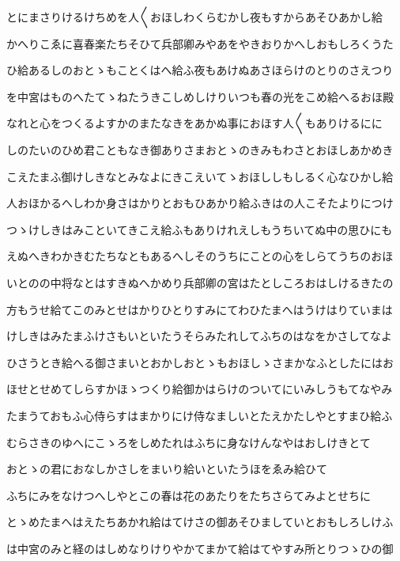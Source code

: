 \documentclass[a4paper,11pt,landscape]{ltjtarticle}
\begin{document}
\par\medskip
とにまさりけるけちめを人〱おほしわくらむかし夜もすからあそひあかし給
\par\medskip
かへりこゑに喜春楽たちそひて兵部卿みやあをやきおりかへしおもしろくうた
\par\medskip
ひ給あるしのおとゝもことくはへ給ふ夜もあけぬあさほらけのとりのさえつり
\par\medskip
を中宮はものへたてゝねたうきこしめしけりいつも春の光をこめ給へるおほ殿
\par\medskip
なれと心をつくるよすかのまたなきをあかぬ事におほす人〱もありけるにに
\par\medskip
しのたいのひめ君こともなき御ありさまおとゝのきみもわさとおほしあかめき
\par\medskip
こえたまふ御けしきなとみなよにきこえいてゝおほししもしるく心なひかし給
\par\medskip
人おほかるへしわか身さはかりとおもひあかり給ふきはの人こそたよりにつけ
\par\medskip
つゝけしきはみこといてきこえ給ふもありけれえしもうちいてぬ中の思ひにも
\par\medskip
えぬへきわかきむたちなともあるへしそのうちにことの心をしらてうちのおほ
\par\medskip
いとのの中将なとはすきぬへかめり兵部卿の宮はたとしころおはしけるきたの
\par\medskip
方もうせ給てこのみとせはかりひとりすみにてわひたまへはうけはりていまは
\par\medskip
けしきはみたまふけさもいといたうそらみたれしてふちのはなをかさしてなよ
\par\medskip
ひさうとき給へる御さまいとおかしおとゝもおほしゝさまかなふとしたにはお
\par\medskip
ほせとせめてしらすかほゝつくり給御かはらけのついてにいみしうもてなやみ
\par\medskip
たまうておもふ心侍らすはまかりにけ侍なましいとたえかたしやとすまひ給ふ
\par\medskip
むらさきのゆへにこゝろをしめたれはふちに身なけんなやはおしけきとて
\par\medskip
おとゝの君におなしかさしをまいり給いといたうほをゑみ給ひて
\par\medskip
ふちにみをなけつへしやとこの春は花のあたりをたちさらてみよとせちに
\par\medskip
とゝめたまへはえたちあかれ給はてけさの御あそひましていとおもしろしけふ
\par\medskip
は中宮のみと経のはしめなりけりやかてまかて給はてやすみ所とりつゝひの御
\par\medskip
\end{document}
